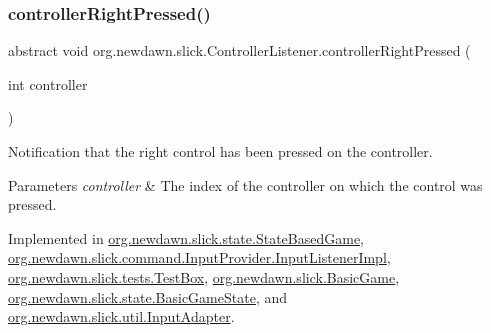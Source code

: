 \mbox{\label{interfaceorg_1_1newdawn_1_1slick_1_1_controller_listener_ae4ac64996df9778c4987705275792780}} 
\subsubsection{\texorpdfstring{controller\+Right\+Pressed()}{controllerRightPressed()}}
{\footnotesize\ttfamily abstract void org.\+newdawn.\+slick.\+Controller\+Listener.\+controller\+Right\+Pressed (\begin{DoxyParamCaption}\item[{int}]{controller }\end{DoxyParamCaption})\hspace{0.3cm}{\ttfamily [abstract]}}

Notification that the right control has been pressed on the controller.


\begin{DoxyParams}{Parameters}
{\em controller} & The index of the controller on which the control was pressed. \\
\hline
\end{DoxyParams}


Implemented in \mbox{\hyperlink{classorg_1_1newdawn_1_1slick_1_1state_1_1_state_based_game_a6285a648c82d4f944f1789059c9e27c3}{org.\+newdawn.\+slick.\+state.\+State\+Based\+Game}}, \mbox{\hyperlink{classorg_1_1newdawn_1_1slick_1_1command_1_1_input_provider_1_1_input_listener_impl_abe27fbc28db92a0549e5e61fd8ce81f1}{org.\+newdawn.\+slick.\+command.\+Input\+Provider.\+Input\+Listener\+Impl}}, \mbox{\hyperlink{classorg_1_1newdawn_1_1slick_1_1tests_1_1_test_box_aa1a006cc38225d293dfceec4c8995bdf}{org.\+newdawn.\+slick.\+tests.\+Test\+Box}}, \mbox{\hyperlink{classorg_1_1newdawn_1_1slick_1_1_basic_game_a8c225d55800c95a5b339468d08fcf48c}{org.\+newdawn.\+slick.\+Basic\+Game}}, \mbox{\hyperlink{classorg_1_1newdawn_1_1slick_1_1state_1_1_basic_game_state_adb19b887e058c5a01741e39fb8aed2fa}{org.\+newdawn.\+slick.\+state.\+Basic\+Game\+State}}, and \mbox{\hyperlink{classorg_1_1newdawn_1_1slick_1_1util_1_1_input_adapter_a558dd87511a7ab61be9d895476e91444}{org.\+newdawn.\+slick.\+util.\+Input\+Adapter}}.

